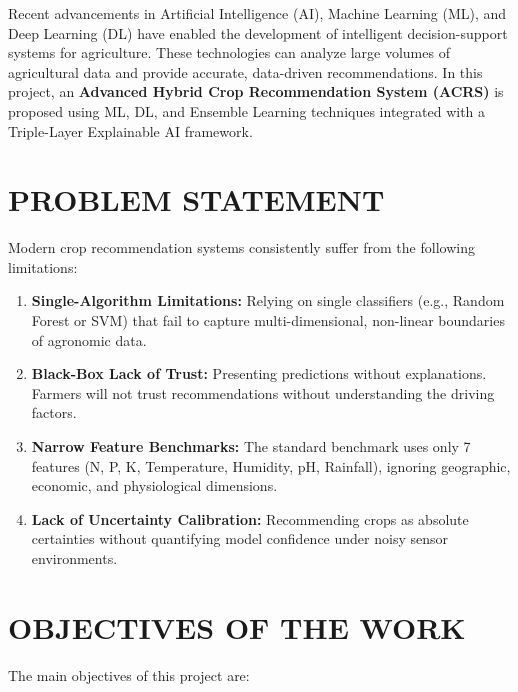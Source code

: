 \documentclass[12pt,a4paper,oneside]{report}
\begin{document}
Recent advancements in Artificial Intelligence (AI), Machine Learning (ML), and Deep Learning (DL) have enabled the development of intelligent decision-support systems for agriculture. These technologies can analyze large volumes of agricultural data and provide accurate, data-driven recommendations. In this project, an \textbf{Advanced Hybrid Crop Recommendation System (ACRS)} is proposed using ML, DL, and Ensemble Learning techniques integrated with a Triple-Layer Explainable AI framework.

\section{PROBLEM STATEMENT}

Modern crop recommendation systems consistently suffer from the following limitations:

\begin{enumerate}[leftmargin=*, label=\arabic*.]
  \item \textbf{Single-Algorithm Limitations:} Relying on single classifiers (e.g., Random Forest or SVM) that fail to capture multi-dimensional, non-linear boundaries of agronomic data.
  \item \textbf{Black-Box Lack of Trust:} Presenting predictions without explanations. Farmers will not trust recommendations without understanding the driving factors.
  \item \textbf{Narrow Feature Benchmarks:} The standard benchmark uses only 7 features (N, P, K, Temperature, Humidity, pH, Rainfall), ignoring geographic, economic, and physiological dimensions.
  \item \textbf{Lack of Uncertainty Calibration:} Recommending crops as absolute certainties without quantifying model confidence under noisy sensor environments.
\end{enumerate}

\section{OBJECTIVES OF THE WORK}

The main objectives of this project are:
\end{document}
